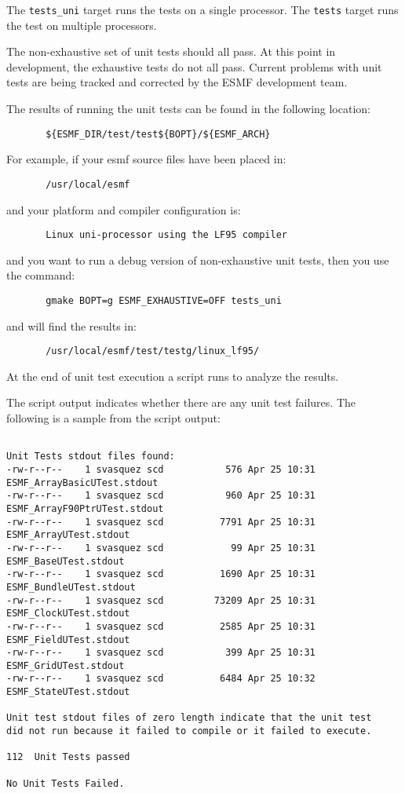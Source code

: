 The {\tt tests\_uni} target runs the tests on a single processor. 
The {\tt tests} target runs the test on multiple processors.

The non-exhaustive set of unit tests should all pass.  At this point in 
development, the exhaustive tests do not all pass.  Current problems with 
unit tests are being tracked and corrected by the ESMF development team.

The results of running the unit tests can be found in the following location:
\begin{verbatim}
       ${ESMF_DIR/test/test${BOPT}/${ESMF_ARCH}
\end{verbatim}

For example, if your esmf source files have been placed in: 
\begin{verbatim}
       /usr/local/esmf
\end{verbatim}

and your platform and compiler configuration is:
\begin{verbatim}
       Linux uni-processor using the LF95 compiler
\end{verbatim}

and you want to run a debug version of non-exhaustive unit tests,
then you use the command:
\begin{verbatim}
       gmake BOPT=g ESMF_EXHAUSTIVE=OFF tests_uni
\end{verbatim}

and will find the results in:
\begin{verbatim}
       /usr/local/esmf/test/testg/linux_lf95/
\end{verbatim}

At the end of unit test execution a script runs to analyze the results.

The script output indicates whether there are any unit test failures.
The following is a sample from the script output:

\begin{verbatim}

Unit Tests stdout files found: 
-rw-r--r--    1 svasquez scd           576 Apr 25 10:31 ESMF_ArrayBasicUTest.stdout
-rw-r--r--    1 svasquez scd           960 Apr 25 10:31 ESMF_ArrayF90PtrUTest.stdout
-rw-r--r--    1 svasquez scd          7791 Apr 25 10:31 ESMF_ArrayUTest.stdout
-rw-r--r--    1 svasquez scd            99 Apr 25 10:31 ESMF_BaseUTest.stdout
-rw-r--r--    1 svasquez scd          1690 Apr 25 10:31 ESMF_BundleUTest.stdout
-rw-r--r--    1 svasquez scd         73209 Apr 25 10:31 ESMF_ClockUTest.stdout
-rw-r--r--    1 svasquez scd          2585 Apr 25 10:31 ESMF_FieldUTest.stdout
-rw-r--r--    1 svasquez scd           399 Apr 25 10:31 ESMF_GridUTest.stdout
-rw-r--r--    1 svasquez scd          6484 Apr 25 10:32 ESMF_StateUTest.stdout

Unit test stdout files of zero length indicate that the unit test
did not run because it failed to compile or it failed to execute. 

112  Unit Tests passed 

No Unit Tests Failed.

\end{verbatim}

